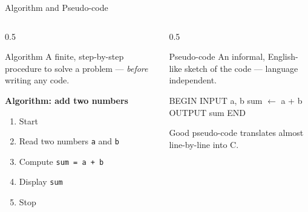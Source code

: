 \documentclass[aspectratio=169]{beamer}
\begin{document}
	\begin{frame}[fragile]{Algorithm and Pseudo-code}
		\begin{columns}[T]
			\begin{column}{0.5\textwidth}
				\begin{block}{Algorithm}
					A finite, step-by-step procedure to solve a problem --- \emph{before} writing any code.
				\end{block}
				\textbf{Algorithm: add two numbers}
				\begin{enumerate}\small
					\item Start
					\item Read two numbers \texttt{a} and \texttt{b}
					\item Compute \texttt{sum = a + b}
					\item Display \texttt{sum}
					\item Stop
				\end{enumerate}
			\end{column}
			\begin{column}{0.5\textwidth}
				\begin{block}{Pseudo-code}
					An informal, English-like sketch of the code --- language independent.
				\end{block}
				\begin{semiverbatim}\small
					BEGIN
					\qquad INPUT a, b
					\qquad sum \(\leftarrow\) a + b
					\qquad OUTPUT sum
					END
				\end{semiverbatim}
				\vspace{0.1cm}
				\footnotesize Good pseudo-code translates almost line-by-line into C.
			\end{column}
		\end{columns}
	\end{frame}
	
\end{document}
